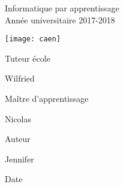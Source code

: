 

{
	\BgThispage
	\thispagestyle{couverture}
	
	
	\makeatletter
	{\LARGE\bfseries\@title\par}
	{\color{aqua}Informatique par apprentissage \\
	\color{aqua}Année universitaire 2017-2018}
	\hfill
	\vspace{0.5cm}
	
	\texttt{[image: caen]}
	\vspace{0.5cm}
	
	\begin{minipage}[c]{0.5\textwidth}
	Tuteur école \par
	{\color{aqua} Wilfried }
	
	\vspace{0.5cm}
	
	Maître d'apprentissage \par
	{\color{aqua} Nicolas }
	\end{minipage}
	\begin{minipage}[c]{0.5\textwidth}
	Auteur \par
	{\color{aqua} Jennifer }
	
	\vspace{0.5cm}
	
	Date \par
	{\color{aqua} \@date}
	\end{minipage}
	
		
		
	
	\makeatother
	
	\vfill
	
	\afterpage{\blankpage}
	\restoregeometry
}